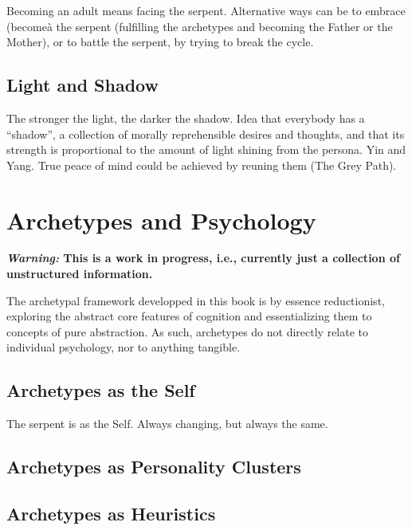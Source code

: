 \documentclass[
]{book}
\begin{document}
Becoming an adult means facing the serpent. Alternative ways can be to embrace (becomeà the serpent (fulfilling the archetypes and becoming the Father or the Mother), or to battle the serpent, by trying to break the cycle.

\hypertarget{light-and-shadow}{%
\section{Light and Shadow}\label{light-and-shadow}}

The stronger the light, the darker the shadow.
Idea that everybody has a ``shadow'', a collection of morally reprehensible desires and thoughts, and that its strength is proportional to the amount of light shining from the persona. Yin and Yang. True peace of mind could be achieved by reuning them (The Grey Path).

\hypertarget{archetypes-and-psychology}{%
\chapter{Archetypes and Psychology}\label{archetypes-and-psychology}}

\textbf{\emph{Warning:} This is a work in progress, i.e., currently just a collection of unstructured information.}

The archetypal framework developped in this book is by essence reductionist, exploring the abstract core features of cognition and essentializing them to concepts of pure abstraction. As such, archetypes do not directly relate to individual psychology, nor to anything tangible.

\hypertarget{archetypes-as-the-self}{%
\section{Archetypes as the Self}\label{archetypes-as-the-self}}

The serpent is as the Self. Always changing, but always the same.

\hypertarget{archetypes-as-personality-clusters}{%
\section{Archetypes as Personality Clusters}\label{archetypes-as-personality-clusters}}

\hypertarget{archetypes-as-heuristics}{%
\section{Archetypes as Heuristics}\label{archetypes-as-heuristics}}
\end{document}
